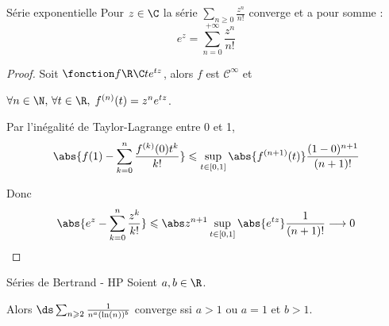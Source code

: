 \begin{proposition}{Série exponentielle}{}
    Pour $z \in \C$ la série $\sum_{n \geqslant 0} \frac{z^n}{n!}$ converge et a pour somme :
    \[e^z = \sum_{n = 0}^{+\infty} \frac{z^n}{n!}\]
\end{proposition}


\begin{proof}
    Soit $\fonction f \R \C t {e^{tz}}$, alors $f$ est $\mathscr C^\infty$ et 
    
    $\forall n \in \N, \, \forall t \in \R, \; f^{(n)}(t) = z^n e^{tz}$.

    Par l'inégalité de Taylor-Lagrange entre 0 et 1, 
    \[\abs{f(1) - \sum_{k = 0}^{n} \frac{f^{(k)}(0)t^k}{k!}} \leqslant \sup_{t \in [0, 1]}\abs{f^{(n + 1)}(t)} \frac{(1 - 0)^{n + 1}}{(n + 1)!}\]

    Donc 
    \[\abs{e^z - \sum_{k = 0 }^{n}\frac{z^k}{k!}} \leqslant \abs z^{n+1} \sup_{t \in [0, 1]} \abs{e^{tz}} \frac{1}{(n + 1)!} \longrightarrow 0\]
\end{proof}

\begin{proposition}{Séries de Bertrand - HP}{}
    Soient $a, b \in \R$. 

    Alors $\ds \sum_{n \geqslant 2} \frac 1 {n^a(\ln(n))^b}$ converge ssi $a > 1$ ou $a = 1$ et $b > 1$.
\end{proposition}


